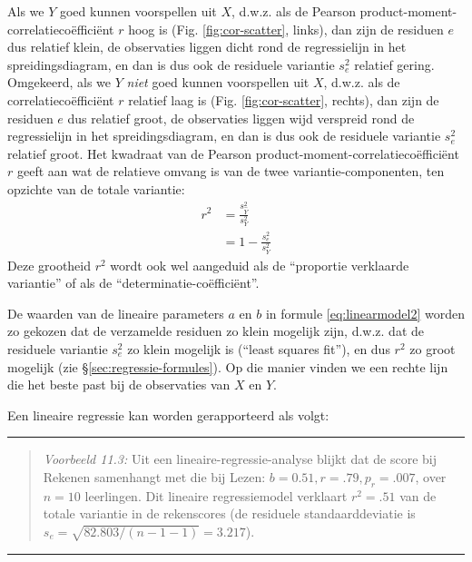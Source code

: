 \documentclass[
]{book}
\begin{document}
Als we \(Y\) goed kunnen voorspellen uit \(X\), d.w.z. als de Pearson
product-moment-correlatiecoëfficiënt \(r\) hoog is
(Fig. \ref{fig:cor-scatter}, links), dan zijn de residuen \(e\) dus
relatief klein, de observaties liggen dicht rond de regressielijn in het
spreidingsdiagram, en dan is dus ook de residuele variantie \(s^2_e\)
relatief gering. Omgekeerd, als we \(Y\) \emph{niet} goed kunnen voorspellen
uit \(X\), d.w.z. als de correlatiecoëfficiënt \(r\) relatief laag is
(Fig. \ref{fig:cor-scatter}, rechts), dan zijn de residuen \(e\) dus
relatief groot, de observaties liggen wijd verspreid rond de
regressielijn in het spreidingsdiagram, en dan is dus ook de residuele
variantie \(s^2_e\) relatief groot. Het kwadraat van de Pearson
product-moment-correlatiecoëfficiënt \(r\) geeft aan wat de relatieve
omvang is van de twee variantie-componenten, ten opzichte van de totale
variantie:
\begin{align}
    r^2 & = \frac{s^2_{\widehat{Y}}}{s^2_Y} \\
        & = 1 - \frac{s^2_e}{s^2_Y}
  \label{eq:r2}
\end{align}
Deze grootheid \(r^2\) wordt ook wel aangeduid als de
``proportie verklaarde variantie'' of als de ``determinatie-coëfficiënt''.

De waarden van de lineaire parameters \(a\) en \(b\) in
formule \eqref{eq:linearmodel2} worden zo gekozen dat de verzamelde
residuen zo klein mogelijk zijn, d.w.z. dat de residuele variantie
\(s^2_e\) zo klein mogelijk is (``least squares fit''), en dus \(r^2\) zo
groot mogelijk (zie
§\ref{sec:regressie-formules}). Op die manier vinden we een rechte
lijn die het beste past bij de observaties van \(X\) en \(Y\).

Een lineaire regressie kan worden gerapporteerd als volgt:

\begin{center}\rule{0.5\linewidth}{0.5pt}\end{center}

\begin{quote}
\emph{Voorbeeld 11.3:}
Uit een lineaire-regressie-analyse blijkt dat de score bij Rekenen
samenhangt met die bij Lezen: \(b=0.51, r=.79, p_r=.007\), over \(n=10\)
leerlingen. Dit lineaire regressiemodel verklaart \(r^2=.51\) van de
totale variantie in de rekenscores (de residuele standaarddeviatie is
\(s_e= \sqrt{82.803/(n-1-1)} = 3.217\)).
\end{quote}

\begin{center}\rule{0.5\linewidth}{0.5pt}\end{center}
\end{document}
